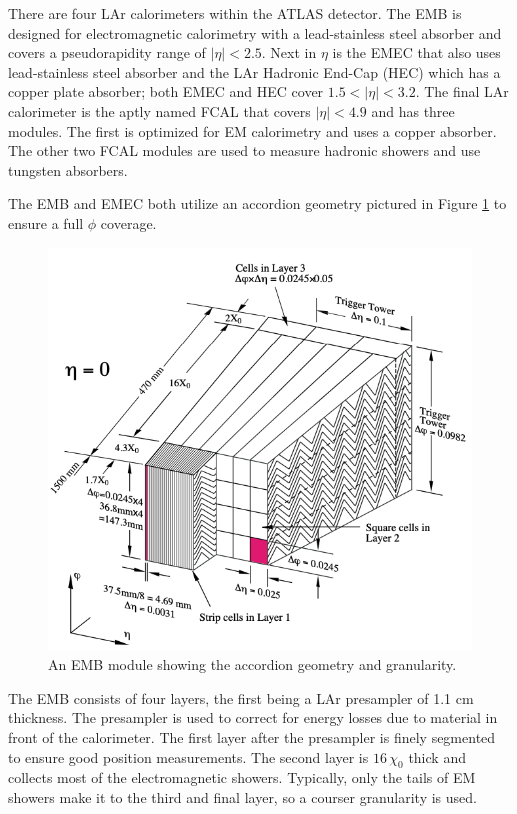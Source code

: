 			There are four \gls{LAr} calorimeters within the \gls{ATLAS} detector. The \gls{EMB} is designed for electromagnetic calorimetry with a lead-stainless steel absorber and covers a pseudorapidity range of $|\eta|<2.5$. Next in $\eta$ is the \gls{EMEC} that also uses lead-stainless steel absorber and the \gls{LAr} Hadronic End-Cap (HEC) which has a copper plate absorber; both \gls{EMEC} and \gls{HEC} cover $1.5 < |\eta| < 3.2$. The final \gls{LAr} calorimeter is the aptly named \gls{FCAL} that covers $|\eta|<4.9$ and has three modules. The first is optimized for \gls{EM} calorimetry and uses a copper absorber. The other two \gls{FCAL} modules are used to measure hadronic showers and use tungsten absorbers.

			The \gls{EMB} and \gls{EMEC} both utilize an accordion geometry pictured in Figure \ref{fig:LAr-accordion} to ensure a full $\phi$ coverage. 
			\begin{figure}[!ht]{}
			\centering
			\includegraphics[width=.45\textwidth,keepaspectratio=true]{chapters/chapter3_experiment/images/LAr_Accordion_Geometry.png}
			\caption{An \gls{EMB} module showing the accordion geometry and granularity. \cite{LAr-TDR}} %
			\label{fig:LAr-accordion}
			\end{figure}
			The \gls{EMB} consists of four layers, the first being a \gls{LAr} presampler of 1.1 cm thickness. The presampler is used to correct for energy losses due to material in front of the calorimeter. The first layer after the presampler is finely segmented to ensure good position measurements. The second layer is $16 \, \chi_0$ thick and collects most of the electromagnetic showers. Typically, only the tails of \gls{EM} showers make it to the third and final layer, so a courser granularity is used. 

